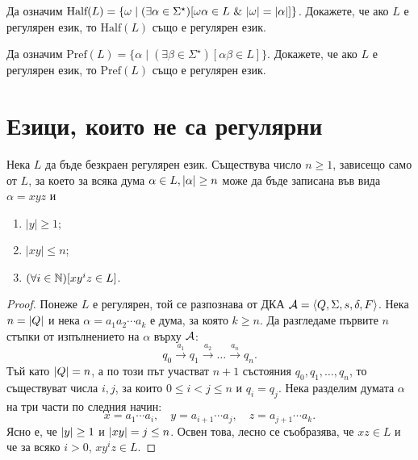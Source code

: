 \begin{problem}
  Да означим $\mbox{Half}(L) = \{\omega\mid (\exists \alpha \in \Sigma^\star)[\omega\alpha \in L\ \&\ \abs{\omega} = \abs{\alpha}]\}$.
  Докажете, че ако $L$ е регулярен език, то $\mbox{Half}(L)$ също е регулярен език.
\end{problem}

\begin{problem}
  Да означим $\mbox{Pref}(L) = \{\alpha \mid (\exists \beta \in \Sigma^\star)[\alpha\beta \in L]\}$.
  Докажете, че ако $L$ е регулярен език, то $\mbox{Pref}(L)$ също е регулярен език.
\end{problem}

\section{Езици, които не са регулярни}
\begin{lemma}
  \label{lem:pumping-reg}
  Нека $L$ да бъде безкраен регулярен език.
  Съществува число $n\geq 1$, зависещо само от $L$, 
  за което за всяка дума $\alpha\in L, \lvert{\alpha}\rvert\geq n$ може да 
  бъде записана във вида $\alpha = xyz$ и 
  \begin{enumerate}[1)]
  \item
    $|y|\geq 1$;
  \item
    $|xy|\leq n$;
  \item
    $(\forall i\in\mathbb{N})[xy^iz \in L]$.
  \end{enumerate}
\end{lemma}
\begin{proof}
  Понеже $L$ е регулярен, той се разпознава от ДКА $\mathcal{A} = \langle{Q,\Sigma,s,\delta,F}\rangle$.
  Нека $n = \lvert{Q}\rvert$ и нека $\alpha = a_1a_2\cdots a_k$ е дума, за която $k \geq n$.
  Да разгледаме първите $n$ стъпки от изпълнението на $\alpha$ върху $\mathcal{A}$:
  \[q_0\stackrel{a_1}{\rightarrow} q_1 \stackrel{a_2}{\rightarrow} \dots \stackrel{a_n}{\rightarrow} q_n.\]
  Тъй като $\lvert{Q}\rvert = n$, а по този път участват $n+1$ състояния $q_0,q_1,\dots,q_n$,
  то съществуват числа $i, j$, за които $0\leq i < j\leq n$ и $q_i = q_j$.
  Нека разделим думата $\alpha$ на три части по следния начин:
  \[x = a_1\cdots a_i,\quad y = a_{i+1}\cdots a_j,\quad z = a_{j+1}\cdots a_k.\]
  Ясно е, че $\lvert{y}\rvert \geq 1$ и $\lvert{xy}\rvert = j \leq n$.
  Освен това, лесно се съобразява, че $xz \in L$ и че за всяко $i > 0$, $xy^iz \in L$.
\end{proof}


